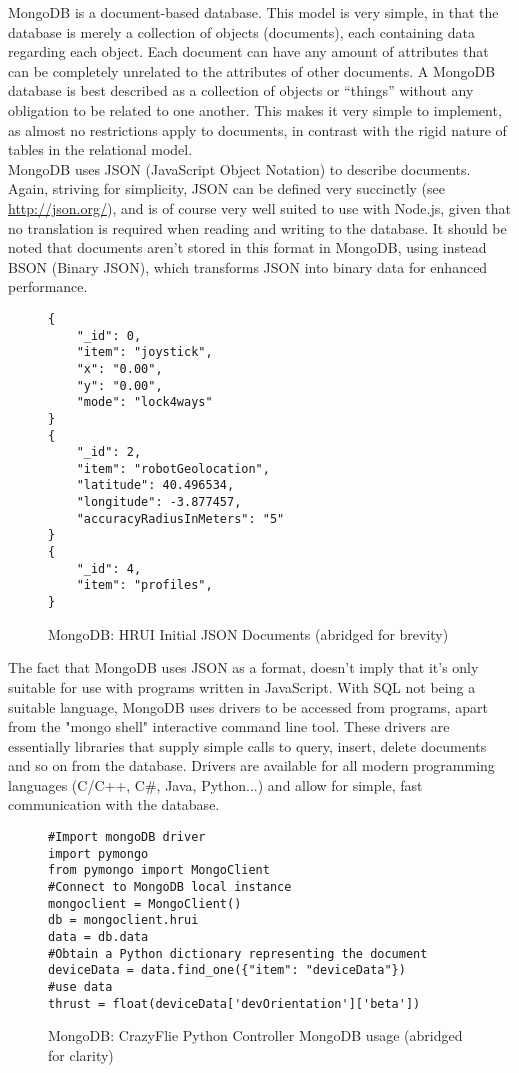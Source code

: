 MongoDB is a document-based database. This model is very simple, in that the database is merely a collection of objects (documents), each containing data regarding each object. Each document can have any amount of attributes that can be completely unrelated to the attributes of other documents. A MongoDB database is best described as a collection of objects or ``things'' without any obligation to be related to one another. This makes it very simple to implement, as almost no restrictions apply to documents, in contrast with the rigid nature of tables in the relational model.\\

MongoDB uses JSON (JavaScript Object Notation) to describe documents. Again, striving for simplicity, JSON can be defined very succinctly (see \url{http://json.org/}), and is of course very well suited to use with Node.js, given that no translation is required when reading and writing to the database. It should be noted that documents aren't stored in this format in MongoDB, using instead BSON (Binary JSON), which transforms JSON into binary data for enhanced performance.
\begin{figure}[H]
\centering
\captionsetup{justification=centering}
\begin{verbatim}
{
    "_id": 0,
    "item": "joystick",
    "x": "0.00",
    "y": "0.00",
    "mode": "lock4ways"
}
{
    "_id": 2,
    "item": "robotGeolocation",
    "latitude": 40.496534,
    "longitude": -3.877457,
    "accuracyRadiusInMeters": "5"
}
{
    "_id": 4,
    "item": "profiles",
}
\end{verbatim}
\caption{MongoDB: HRUI Initial JSON Documents (abridged for brevity)}
\end{figure}
The fact that MongoDB uses JSON as a format, doesn't imply that it's only suitable for use with programs written in JavaScript. With SQL not being a suitable language, MongoDB uses drivers to be accessed from programs, apart from the "mongo shell" interactive command line tool. These drivers are essentially libraries that supply simple calls to query, insert, delete documents and so on from the database. Drivers are available for all modern programming languages (C/C++, C\#, Java, Python...\cite{mongodb11}) and allow for simple, fast communication with the database.
\begin{figure}[H]
\centering
\captionsetup{justification=centering}
\begin{verbatim}
#Import mongoDB driver
import pymongo
from pymongo import MongoClient
#Connect to MongoDB local instance
mongoclient = MongoClient()
db = mongoclient.hrui
data = db.data
#Obtain a Python dictionary representing the document
deviceData = data.find_one({"item": "deviceData"})
#use data
thrust = float(deviceData['devOrientation']['beta'])
\end{verbatim}
\caption{MongoDB: CrazyFlie Python Controller MongoDB usage (abridged for clarity)}
\end{figure}
